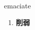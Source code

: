 
\begin{frame}
{\huge emaciate}
\begin{center}
\begin{enumerate}\Large
  \item \textbf{削弱}
\end{enumerate}
\end{center}
\end{frame}

